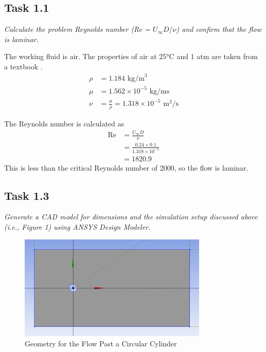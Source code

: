 \subsection*{Task 1.1}
\textit{Calculate the problem Reynolds number (Re = $U_\infty D/\nu$) and confirm that the flow is laminar.}

The working fluid is air. The properties of air at 25°C and 1 atm are taken from a textbook \cite{Cengel2017-jf}.
\begin{align*}
    \rho &= 1.184 \text{ kg/m}^3 \\
    \mu &= 1.562 \times 10^{-5} \text{ kg/ms} \\
    \nu &= \frac{\mu}{\rho} = 1.318 \times 10^{-5} \text{ m}^2/\text{s}
\end{align*}

The Reynolds number is calculated as
\begin{align*}
    \text{Re} &= \frac{U_\infty D}{\nu} \\
    &= \frac{0.24  \times 0.1}{1.318 \times 10^{-5}} \\
    &= 1820.9
\end{align*}
This is less than the critical Reynolds number of 2000, so the flow is laminar.

\subsection*{Task 1.3}
\textit{Generate a CAD model for dimensions and the simulation setup discussed above (i.e., Figure 1) using ANSYS Design Modeler.}
\begin{figure}[H]
    \centering
    \includegraphics[width=0.8\textwidth]{Questions/Figures/geometry.png}
    \caption{Geometry for the Flow Past a Circular Cylinder}
\end{figure}

